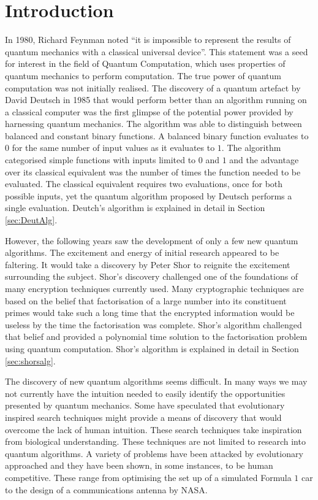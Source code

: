 \chapter{Introduction}
 \setcounter{page}{0} 

In 1980, Richard Feynman noted ``it is impossible to represent the results of quantum mechanics with a classical universal device''\cite{Feynman82simulatingphysics}.
This statement was a seed for interest in the field of Quantum Computation, which uses properties of quantum mechanics to perform computation.
The true power of quantum computation was not initially realised.
The discovery of a quantum artefact by David Deutsch\cite{Deutsch85quantumtheory} in 1985 that would perform better than an algorithm running on a classical computer was the first glimpse of the potential power provided by harnessing quantum mechanics.
The algorithm was able to distinguish between balanced and constant binary functions.
A balanced binary function evaluates to $0$ for the same number of input values as it evaluates to $1$. 
The algorithm categorised simple functions with inputs limited to $0$ and $1$ and the advantage over its classical equivalent was the number of times the function needed to be evaluated.
The classical equivalent requires two evaluations, once for both possible inputs, yet the quantum algorithm proposed by Deutsch performs a single evaluation.
Deutch's algorithm is explained in detail in Section \ref{sec:DeutAlg}.

However, the following years saw the development of only a few new quantum algorithms.
The excitement and energy of initial research appeared to be faltering.
It would take a discovery by Peter Shor\cite{Shor:1994jg} to reignite the excitement surrounding the subject.
Shor's discovery challenged one of the foundations of many encryption techniques currently used.
Many cryptographic techniques are based on the belief that factorisation of a large number into its constituent primes would take such a long time that the encrypted information would be useless by the time the factorisation was complete.
Shor's algorithm challenged that belief and provided a polynomial time solution to the factorisation problem using quantum computation.
Shor's algorithm is explained in detail in Section \ref{sec:shorsalg}.

The discovery of new quantum algorithms seems difficult.
In many ways we may not currently have the intuition needed to easily identify the opportunities presented by quantum mechanics.
Some have speculated that evolutionary inspired search techniques might provide a means of discovery that would overcome the lack of human intuition.
These search techniques take inspiration from biological understanding.
These techniques are not limited to research into quantum algorithms.
A variety of problems have been attacked by evolutionary approached and they have been shown, in some instances, to be human competitive.
These range from optimising the set up of a simulated Formula $1$ car\cite{Wloch04optimisingthe} to the design of a communications antenna\cite{antennades} by NASA.

